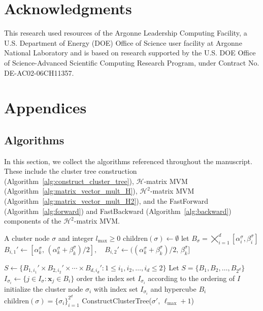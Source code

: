 \documentclass[final,3p,times]{elsarticle}
\newcommand{\mc}[1]{\mathcal{#1}}
\renewcommand{\vec}[1]{\boldsymbol{#1}}
\begin{document}
\section*{Acknowledgments}
This research used resources of the Argonne Leadership Computing Facility, a U.S. Department of Energy (DOE) Office of Science user facility at Argonne National Laboratory and is based on research supported by the U.S. DOE Office of Science-Advanced Scientific Computing Research Program, under Contract No. DE-AC02-06CH11357.
 

\appendix
\label{appendix}
\section{Appendices}

\subsection{Algorithms}
In this section, we collect the algorithms referenced throughout the manuscript. These include the cluster tree construction (Algorithm~\ref{alg:construct_cluster_tree}), $\mc{H}$-matrix MVM (Algorithm~\ref{alg:matrix_vector_mult_H}), $\mc{H}^2$-matrix MVM (Algorithm~\ref{alg:matrix_vector_mult_H2}), and  the FastForward  (Algorithm~\ref{alg:forward}) and FastBackward (Algorithm~\ref{alg:backward}) components of the $\mc{H}^2$-matrix MVM.
\begin{algorithm}[!ht]
\caption{ConstructClusterTree}\label{alg:construct_cluster_tree}
\begin{algorithmic}[1]
\Require A cluster node \( \sigma \) and integer $l_{\max} \ge 0$ 
    \State $\text{children}(\sigma) \gets \emptyset$
    \State \Return
\EndIf
\State let $B_{\sigma} = \bigtimes_{i=1}^{d}[\alpha^{\sigma}_i, \beta^{\sigma}_i]$ 
\State $B_{i,1}' \gets [\alpha^{\sigma}_k,\, (\alpha^{\sigma}_k + \beta^{\sigma}_k)/2], \quad
       B_{i,2}' \gets ((\alpha^{\sigma}_k + \beta^{\sigma}_k)/2,\, \beta^{\sigma}_k]$

\EndFor
\State $S \gets \{B_{1, i_1}' \times B_{2, i_2 }' \times \cdots \times B_{d, i_d}' : 1 \le i_{1}, i_{2}, \dots , i_{d} \le 2 \} $ 
\State Let $S = \{B_{1}, B_{2}, \dots, B_{2^d}\}$ 
\State $I_{\sigma_{i}} \gets \{j \in I_{\sigma}: \vec{x}_{j} \in B_{i}\}$
\State order the index set $I_{\sigma_{i}}$ according to the ordering of $I$
\State initialize the cluster node $\sigma_{i}$ with index set $I_{\sigma_{i}}$ and hypercube $B_{i}$
\EndFor
\State $\text{children}(\sigma) = \{\sigma_{i} \}_{i=1}^{2^d}$
\State ConstructClusterTree($\sigma'$, $\ell_{\max} + 1$)
\EndFor
\end{algorithmic}
\end{algorithm}
\end{document}
